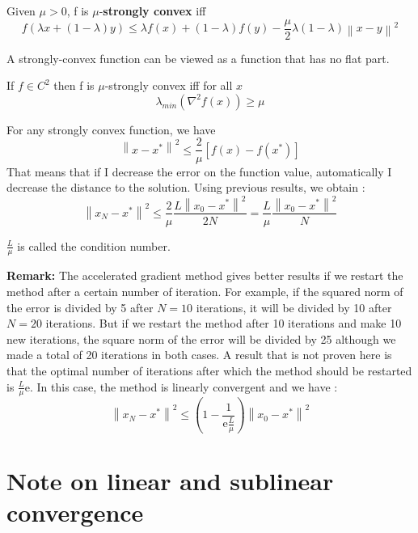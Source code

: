 \begin{definition}
Given $\mu>0$, f is $\mu$-\textbf{strongly convex} iff
\begin{equation*}
f(\lambda x + (1-\lambda)y)\leq \lambda f(x) + (1-\lambda)f(y) - \frac{\mu}{2}\lambda (1-\lambda)\left\|x - y\right\|^2
\end{equation*}
\end{definition}

A strongly-convex function can be viewed as a function that has no flat part.

\begin{proposition}
If $f \in C^2$ then f is $\mu$-strongly convex iff for all $x$ 
\[
    \lambda_{min}(\nabla^2f(x))\ge \mu
\]
\end{proposition}


\begin{lemma}
For any strongly convex function, we have
\begin{equation*}
\left\|x - x^*\right\|^2 \leq \frac{2}{\mu}[f(x) - f(x^*)]
\end{equation*}
That means that if I decrease the error on the function value, automatically I decrease the distance to the solution. Using previous results, we obtain :
\begin{equation*}
\left\|x_N - x^*\right\|^2 \leq \frac{2}{\mu}\frac{L\left\|x_0 - x^*\right\|^2}{2N} = \frac{L}{\mu}\frac{\left\|x_0 - x^*\right\|^2}{N}
\end{equation*}
\end{lemma}

$\frac{L}{\mu}$ is called the condition number.


\textbf{Remark:} The accelerated gradient method gives better results if we restart the method after a certain number of iteration. For example, if the squared norm of the error is divided by 5 after $N = 10$ iterations, it will be divided by 10 after $N = 20$ iterations. But if we restart the method after 10 iterations and make 10 new iterations, the square norm of the error will be divided by 25 although we made a total of 20 iterations in both cases. A result that is not proven here is that the optimal number of iterations after which the method should be restarted is $\frac{L}{\mu}\text{e}$. In this case, the method is linearly convergent and we have :
\[
    \left\|x_N - x^*\right\|^2 \leq \left(1-\frac{1}{\text{e}\frac{L}{\mu}}\right)\left\|x_0 - x^*\right\|^2
\]


\section{Note on linear and sublinear convergence}

